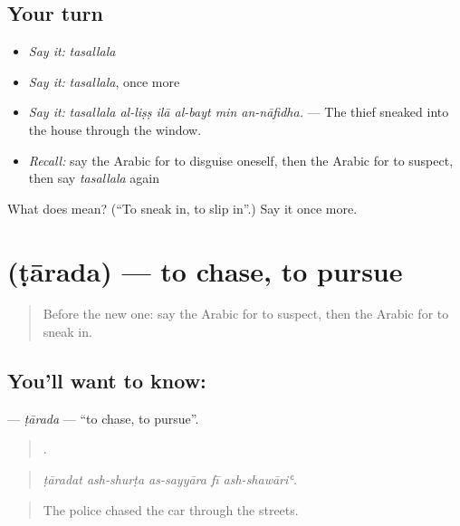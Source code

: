\subsection*{Your turn}
\begin{itemize}
\raggedright
  \item \emph{Say it:} \emph{tasallala}
  \item \emph{Say it:} \emph{tasallala}, once more
  \item \emph{Say it:} \emph{tasallala al-liṣṣ ilā al-bayt min an-nāfidha.} — The thief sneaked into the house through the window.
  \item \emph{Recall:} say the Arabic for to disguise oneself, then the Arabic for to suspect, then say \emph{tasallala} again
\end{itemize}

\begin{tcolorbox}[breakable,colback=teal!4,colframe=teal!35!black,title={Before you move on}]
What does  mean? (\textquotedblleft{}To sneak in, to slip in\textquotedblright{}.) Say it once more.
\end{tcolorbox}
\section[\texorpdfstring{\ar{طارد} (ṭārada)}{طارد (ṭārada)}]{ (ṭārada) — to chase, to pursue}

\label{lesson:AR-C346-tarada}



\begin{quote}
Before the new one: say the Arabic for to suspect, then the Arabic for to sneak in.
\end{quote}

\subsection*{You'll want to know: }
\textbf{} — \emph{ṭārada} — \textquotedblleft{}to chase, to pursue\textquotedblright{}.

\begin{quote}
    .
\end{quote}

\begin{quote}
\emph{ṭāradat ash-shurṭa as-sayyāra fī ash-shawāriʿ.}
\end{quote}

\begin{quote}
The police chased the car through the streets.
\end{quote}

